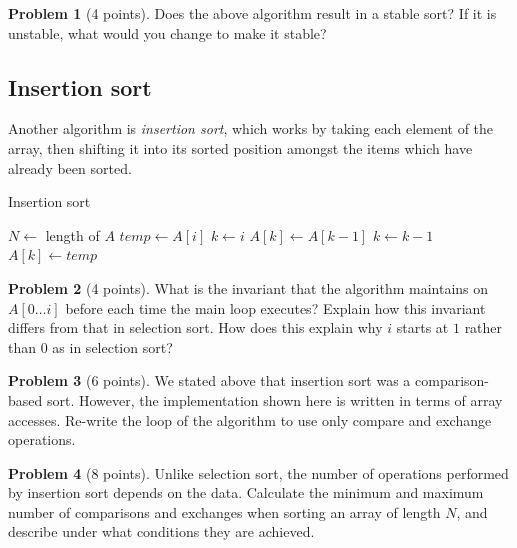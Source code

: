 \documentclass{exam}
\theoremstyle{definition}
\newtheorem{problem}{Problem}[section]
\theoremstyle{definition}
\begin{document}
\begin{problem}[4 points]
    Does the above algorithm result in a stable sort? If it is unstable, what would you change to make it stable?
\end{problem}



\subsection{Insertion sort}

Another algorithm is \textit{insertion sort}, which works by taking each element of the array, then shifting it into its sorted position amongst the items which have already been sorted.

\begin{algorithm}[H]
\caption{Insertion sort}
\begin{algorithmic}
    \State $N \gets$ length of $A$
        \State $temp \gets A[i]$
        \State $k \gets i$
            \State $A[k] \gets A[k - 1]$
            \State $k \gets k - 1$
        \EndWhile
        \State $A[k] \gets temp$
    \EndFor
\EndFunction
\end{algorithmic}
\end{algorithm}

\begin{problem}[4 points]
    What is the invariant that the algorithm maintains on $A[0 \dots i]$ before each time the main loop executes? Explain how this invariant differs from that in selection sort. How does this explain why $i$ starts at $1$ rather than $0$ as in selection sort?
\end{problem}

\begin{problem}[6 points]
    We stated above that insertion sort was a comparison-based sort. However, the implementation shown here is written in terms of array accesses. Re-write the loop of the algorithm to use only compare and exchange operations.
\end{problem}

\begin{problem}[8 points]
    Unlike selection sort, the number of operations performed by insertion sort depends on the data. Calculate the minimum and maximum number of comparisons and exchanges when sorting an array of length $N$, and describe under what conditions they are achieved.
\end{problem}
\end{document}
